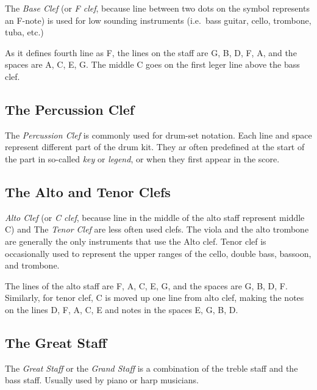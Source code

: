 The \textit{Base Clef} (or \textit{F clef}, because line between two dots on the symbol represents an F-note) is used for
low sounding instruments (i.e.\ bass guitar, cello, trombone, tuba, etc.)


As it defines fourth line as F, the lines on the staff are G, B, D, F, A, and the spaces are A, C, E, G\@. The middle C
goes on the first leger line above the bass clef.


\subsection{The Percussion Clef}\label{subsec:the-percussion-clef}

The \textit{Percussion Clef} is commonly used for drum-set notation. Each line and space represent different part of
the drum kit. They ar often predefined at the start of the part in so-called \textit{key} or \textit{legend}, or when
they first appear in the score.



\subsection{The Alto and Tenor Clefs}\label{subsec:the-alto-and-tenor-clefs}

\textit{Alto Clef} (or \textit{C clef}, because line in the middle of the alto staff represent middle C) and
The \textit{Tenor Clef} are less often used clefs. The viola and the alto trombone are generally the only instruments that
use the Alto clef. Tenor clef is occasionally used to represent the upper ranges of the cello, double bass, bassoon,
and trombone.

The lines of the alto staff are F, A, C, E, G, and the spaces are G, B, D, F\@. Similarly, for tenor clef, C is moved up
one line from alto clef, making the notes on the lines D, F, A, C, E and notes in the spaces E, G, B, D\@.

\subsection{The Great Staff}\label{subsec:the-great-staff}
The \textit{Great Staff} or the \textit{Grand Staff} is a combination of the treble staff and the bass staff. Usually
used by piano or harp musicians.

